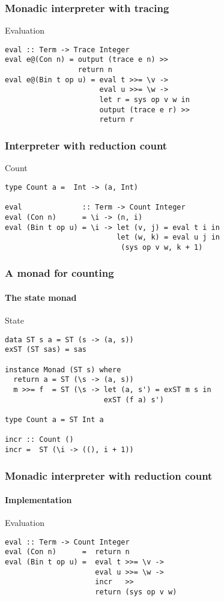 \documentclass{beamer}
\begin{document}
\begin{frame}[fragile]
 \frametitle{Monadic interpreter with tracing}
 \begin{exampleblock}{Evaluation}
\begin{lstlisting}
eval :: Term -> Trace Integer
eval e@(Con n) = output (trace e n) >>
                 return n
eval e@(Bin t op u) = eval t >>= \v ->
                      eval u >>= \w ->
                      let r = sys op v w in
                      output (trace e r) >>
                      return r
\end{lstlisting}
\end{exampleblock}      
\end{frame}             

\begin{frame}[fragile]
  \frametitle{Interpreter with reduction count}\small
  \begin{block}{Count}
\begin{lstlisting}
type Count a =  Int -> (a, Int)

eval              :: Term -> Count Integer
eval (Con n)      = \i -> (n, i)
eval (Bin t op u) = \i -> let (v, j) = eval t i in    
                          let (w, k) = eval u j in
                           (sys op v w, k + 1)
\end{lstlisting} 
\end{block}
\end{frame}            


\begin{frame}[fragile]
  \frametitle{A monad for counting}
  \framesubtitle{The state monad}
  \begin{alertblock}{State}
\begin{lstlisting}
data ST s a = ST (s -> (a, s))
exST (ST sas) = sas

instance Monad (ST s) where
  return a = ST (\s -> (a, s))
  m >>= f  = ST (\s -> let (a, s') = exST m s in
                       exST (f a) s')

type Count a = ST Int a

incr :: Count ()
incr =  ST (\i -> ((), i + 1))
\end{lstlisting} 
\end{alertblock}
\end{frame}

\begin{frame}[fragile]
  \frametitle{Monadic interpreter with reduction count}
  \framesubtitle{Implementation}
\begin{exampleblock}{Evaluation}
\begin{lstlisting}
eval :: Term -> Count Integer
eval (Con n)      =  return n
eval (Bin t op u) =  eval t >>= \v ->
                     eval u >>= \w ->
                     incr   >>
                     return (sys op v w)
\end{lstlisting} 
\end{exampleblock}
\end{frame}            
\end{document}
